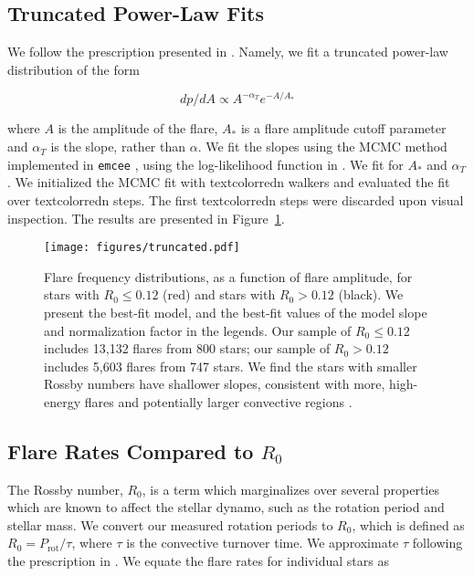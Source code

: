 \documentclass[twocolumn]{aastex631}
\begin{document}
\subsection{Truncated Power-Law Fits}

We follow the prescription presented in \cite{seligman22}. Namely, we fit a truncated
power-law distribution of the form

\begin{equation}
  dp/dA \propto A^{-\alpha_T} e^{-A/A_*}
\end{equation}

where $A$ is the amplitude of the flare, $A_*$ is a flare amplitude cutoff parameter
and $\alpha_T$ is the slope, rather than
$\alpha$. We fit the slopes using the MCMC method implemented in \texttt{emcee}
\citep{goodman10, emcee}, using the log-likelihood function in \cite{seligman22}.
We fit for $A_*$ and $\alpha_T$. We initialized the MCMC fit with textcolor{red}{n}
walkers and evaluated the fit over textcolor{red}{n} steps. The first textcolor{red}{n}
steps were discarded upon visual inspection. The results are presented in Figure~\ref{fig:truncated}.

\begin{figure}[ht!]
    \begin{centering}
        \texttt{[image: figures/truncated.pdf]}
        \caption{
            Flare frequency distributions, as a function of flare amplitude, for stars with $R_0 \leq 0.12$ (red) and stars with $R_0 > 0.12$ (black). We present the best-fit model, and the best-fit values of the model slope and normalization factor in the legends. Our sample of $R_0 \leq 0.12$ includes 13,132 flares from 800 stars; our sample of $R_0 > 0.12$ includes 5,603 flares from 747 stars. We find the stars with smaller Rossby numbers have shallower slopes, consistent with more, high-energy flares and potentially larger convective regions \citep{seligman22}.
        }
        \label{fig:truncated}
    \end{centering}
\end{figure}

\subsection{Flare Rates Compared to $R_0$}

The Rossby number, $R_0$, is a term which marginalizes over several properties which are known to
affect the stellar dynamo, such as the rotation period and stellar mass. We convert our measured
rotation periods to $R_0$, which is defined as $R_0 = P_\textrm{rot}/\tau$, where $\tau$ is the
convective turnover time. We approximate $\tau$ following the prescription in \cite{wright11}. We
equate the flare rates for individual stars as
\end{document}
